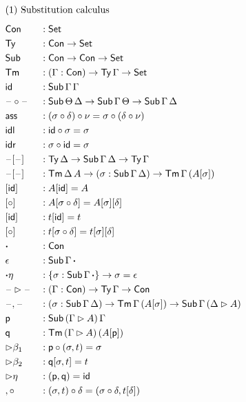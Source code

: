 \documentclass[a4paper,UKenglish,cleveref, autoref]{lipics-v2019}
\begin{document}
\begin{alignat*}{5}
  & \rlap{(1) Substitution calculus} \\[0.5em]
  & \Con && : \Set \\
  & \Ty  && : \Con\ra\Set \\
  & \Sub  && : \Con\ra\Con\ra\Set \\
  & \Tm  && : (\Gamma:\Con)\ra\Ty\,\Gamma\ra\Set \\
  & \id && : \Sub\,\Gamma\,\Gamma \\
  & \blank\circ\blank && : \Sub\,\Theta\,\Delta\ra\Sub\,\Gamma\,\Theta\ra\Sub\,\Gamma\,\Delta \\
  & \ass && : (\sigma \circ \delta) \circ \nu = \sigma \circ (\delta \circ \nu) \\
  & \idl && : \id\circ\sigma = \sigma \\
  & \idr && : \sigma\circ\id = \sigma \\
  & \blank[\blank] && : \Ty\,\Delta\ra\Sub\,\Gamma\,\Delta\ra\Ty\,\Gamma \\
  & \blank[\blank] && : \Tm\,\Delta\,A\ra(\sigma:\Sub\,\Gamma\,\Delta)\ra\Tm\,\Gamma\,(A[\sigma]) \\
  & [\id] && : A[\id] = A \\
  & [\circ] && : A[\sigma \circ \delta] = A[\sigma][\delta] \\
  & [\id] && : t[\id] = t \\
  & [\circ] && : t[\sigma \circ \delta] = t[\sigma][\delta] \\
  & \boldsymbol{\cdot} && : \Con \\
  & \epsilon && : \Sub\,\Gamma\,\boldsymbol{\cdot} \\
  & {\boldsymbol{\cdot}\eta} && : \{\sigma : \Sub\,\Gamma\,\boldsymbol{\cdot}\} \ra \sigma = \epsilon \\
  & \blank\ext\blank && : (\Gamma:\Con)\ra\Ty\,\Gamma\ra\Con \\
  & \blank,\blank && : (\sigma:\Sub\,\Gamma\,\Delta)\ra\Tm\,\Gamma\,(A[\sigma])\ra\Sub\,\Gamma\,(\Delta\ext A) \\
  & \p && : \Sub\,(\Gamma\ext A)\,\Gamma \\
  & \q && : \Tm\,(\Gamma\ext A)\,(A[\p]) \\
  & {\ext\beta_1} && : \p\circ(\sigma, t) = \sigma \\
  & {\ext\beta_2} && : \q[\sigma, t] = t \\
  & {\ext\eta} && : (\p, \q) = \id \\
  & {,\circ} && : (\sigma, t)\circ\delta = (\sigma\circ\delta, t[\delta]) \\[0.5em]

\end{alignat*}
\end{document}
